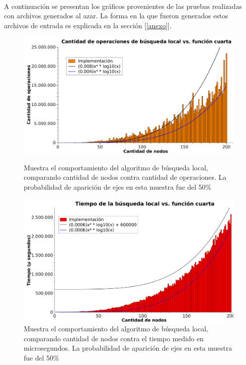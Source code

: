 \paragraph{}
A continuación se presentan los gráficos provenientes de las pruebas realizadas con archivos generados al azar. La forma en la que fueron generados estos archivos de entrada es explicada en la sección [\ref{anexo}].

\begin{figure}[htb]
    \begin{minipage}{\textwidth}
	\begin{center}
		\includegraphics[width=\textwidth]{./otros/graficos/operaciones_200nodos1_ej4.pdf}
		\caption{Muestra el comportamiento del algoritmo de búsqueda local, comparando cantidad de nodos contra cantidad de operaciones. La probabilidad de aparición de ejes en esta muestra fue del 50\%}
		\label{ej4contarOp}
	\end{center}
    \end{minipage}

\vspace*{0.5cm}

    \begin{minipage}{\textwidth}
	\begin{center}
		\includegraphics[width=\textwidth]{./otros/graficos/tiempo_200nodos1_ej4.pdf}
		\caption{Muestra el comportamiento del algoritmo de búsqueda local, comparando cantidad de nodos contra el tiempo medido en microsegundos. La probabilidad de aparición de ejes en esta muestra fue del 50\%}
		\label{ej4contarTiempo}
	\end{center}
    \end{minipage}

\end{figure}
\clearpage

